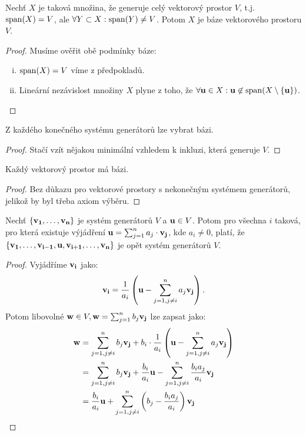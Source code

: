 \begin{proposition}
    Nechť $X$ je taková množina, že generuje celý vektorový prostor $V$, t.j.
    $\mathop{\mathrm{span}}(X) = V$, ale $\forall Y \subset X: \mathop{\mathrm{span}}(Y) \neq V$. Potom $X$ 
    je báze vektorového prostoru $V$.
\end{proposition}

\begin{proof}
    Musíme ověřit obě podmínky báze:
    \begin{enumerate}[i.]
        \item $\mathop{\mathrm{span}}(X) = V$ víme z předpokladů.
        \item Lineární nezávislost množiny $X$ plyne z toho, že $\forall
            \mathbf{u} \in X: \mathbf{u} \not \in \mathop{\mathrm{span}}(X \setminus \{\mathbf{u}\})$.
    \end{enumerate}
\end{proof}

\begin{corollary}
    Z každého konečného systému generátorů lze vybrat bázi.
\end{corollary}

\begin{proof}
    Stačí vzít nějakou minimální vzhledem k inkluzi, která generuje $V$.
\end{proof}

\begin{theorem}
    Každý vektorový prostor má bázi.
\end{theorem}

\begin{proof}
    Bez důkazu pro vektorové prostory s nekonečným systémem generátorů,
    jelikož by byl třeba axiom výběru.
\end{proof}

\begin{lemma}
    \label{lemma:ovymene}
    Nechť $\{\mathbf{v_1}, \dots, \mathbf{v_n}\}$ je systém generátorů $V$ a $\mathbf{u} \in V$. 
    Potom pro všechna $i$ taková, pro která existuje výjádření 
    $\mathbf{u} = \sum_{j = 1}^n a_j \cdot \mathbf{v_j}$, kde $a_i \neq 0$, platí, že 
    $\{\mathbf{v_1}, \dots, \mathbf{v_{i-1}}, \mathbf{u}, \mathbf{v_{i+1}}, \dots, \mathbf{v_n}\}$ je 
    opět systém generátorů $V$.
\end{lemma}

\begin{proof}
    Vyjádříme $\mathbf{v_i}$ jako: 
    $$\mathbf{v_i} = \frac{1}{a_i}\left(\mathbf{u} - \sum_{j=1, j \neq i}^{n} a_j\mathbf{v_j}\right).$$ 
    Potom libovolné $\mathbf{w} \in V, \mathbf{w} = \sum_{j=1}^{n} b_j\mathbf{v_j}$ lze zapsat jako:
    \begin{align*}
        \mathbf{w} &= \sum_{j=1, j \neq i}^{n} b_j\mathbf{v_j} + b_i \cdot
            \frac{1}{a_i}\left(\mathbf{u} - \sum_{j=1, j \neq i}^{n} a_j\mathbf{v_j}\right) \\
            &= \sum_{j=1, j \neq i}^{n} b_j\mathbf{v_j} + \frac{b_i}{a_i}\mathbf{u} 
            - \sum_{j=1, j \neq i}^{n} \frac{b_ia_j}{a_i}\mathbf{v_j} \\
            &= \frac{b_i}{a_i}\mathbf{u} + \sum_{j=1, j \neq i}^{n} 
                \left(b_j - \frac{b_ia_j}{a_i}\right)\mathbf{v_j}
    \end{align*}
\end{proof}

